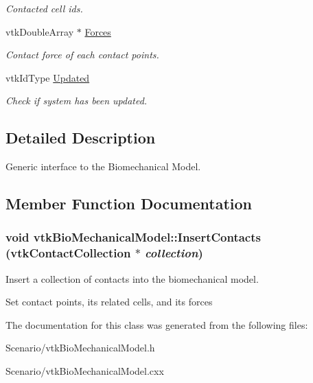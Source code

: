 \begin{DoxyCompactItemize}
\begin{DoxyCompactList}\small\item\em Contacted cell ids. \item\end{DoxyCompactList}\item 
\hypertarget{classvtkBioMechanicalModel_a5c654834f7c6c121a3dd38df5baf343e}{
vtkDoubleArray $\ast$ \hyperlink{classvtkBioMechanicalModel_a5c654834f7c6c121a3dd38df5baf343e}{Forces}}
\label{classvtkBioMechanicalModel_a5c654834f7c6c121a3dd38df5baf343e}

\begin{DoxyCompactList}\small\item\em Contact force of each contact points. \item\end{DoxyCompactList}\item 
\hypertarget{classvtkBioMechanicalModel_accf0613204c31119952f80219983a521}{
vtkIdType \hyperlink{classvtkBioMechanicalModel_accf0613204c31119952f80219983a521}{Updated}}
\label{classvtkBioMechanicalModel_accf0613204c31119952f80219983a521}

\begin{DoxyCompactList}\small\item\em Check if system has been updated. \item\end{DoxyCompactList}\end{DoxyCompactItemize}


\subsection{Detailed Description}
Generic interface to the Biomechanical Model. 

\subsection{Member Function Documentation}
\hypertarget{classvtkBioMechanicalModel_a6856ee291a45b9a0332e9319c383d189}{
\subsubsection[{InsertContacts}]{\setlength{\rightskip}{0pt plus 5cm}void vtkBioMechanicalModel::InsertContacts ({\bf vtkContactCollection} $\ast$ {\em collection})}}
\label{classvtkBioMechanicalModel_a6856ee291a45b9a0332e9319c383d189}


Insert a collection of contacts into the biomechanical model. 

Set contact points, its related cells, and its forces 

The documentation for this class was generated from the following files:\begin{DoxyCompactItemize}
\item 
Scenario/vtkBioMechanicalModel.h\item 
Scenario/vtkBioMechanicalModel.cxx\end{DoxyCompactItemize}
